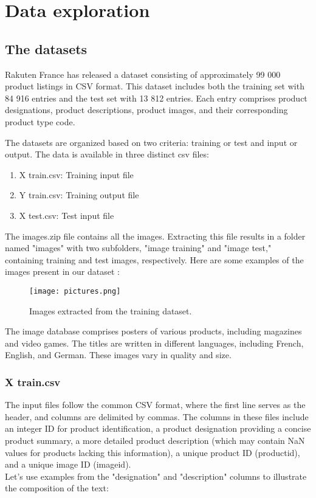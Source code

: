 \chapter{Data exploration}


\section{The datasets}
Rakuten France has released a dataset consisting of approximately 99 000 product listings in CSV format. This dataset includes both the training set with 84 916 entries and the test set with 13 812 entries. Each entry comprises product designations, product descriptions, product images, and their corresponding product type code.

The datasets are organized based on two criteria: training or test and input or output. The data is available in three distinct csv files:

\begin{enumerate}
	\item X train.csv: Training input file
	\item Y train.csv: Training output file
	\item X test.csv: Test input file
\end{enumerate}

The images.zip file contains all the images. Extracting this file results in a folder named "images" with two subfolders, "image training" and "image test," containing training and test images, respectively. Here are some examples of the images present in our dataset : 

\begin{figure}[h]
	\centering
	\texttt{[image: pictures.png]}
	\caption{Images extracted from the training dataset.}
	\label{fig:label}
\end{figure}

\newpage

The image database comprises posters of various products, including magazines and video games. The titles are written in different languages, including French, English, and German. These images vary in quality and size.

\subsection{X train.csv}
The input files follow the common CSV format, where the first line serves as the header, and columns are delimited by commas. The columns in these files include an integer ID for product identification, a product designation providing a concise product summary, a more detailed product description (which may contain NaN values for products lacking this information), a unique product ID (productid), and a unique image ID (imageid).\\
Let's use examples from the "designation" and "description" columns to illustrate the composition of the text:\\

